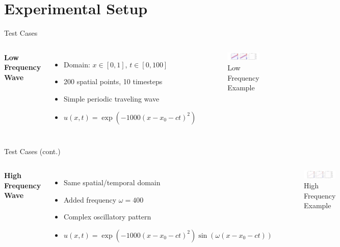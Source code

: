 \documentclass{beamer}
\begin{document}
\section{Experimental Setup}
\begin{frame}{Test Cases}
    \begin{columns}
        \textbf{Low Frequency Wave}
        \begin{itemize}
            \item Domain: $x \in [0,1]$, $t \in [0,100]$
            \item 200 spatial points, 10 timesteps
            \item Simple periodic traveling wave
            \item $u(x,t) = \exp(-1000(x-x_0-ct)^2)$
        \end{itemize}
        
        \begin{figure}
            \includegraphics[width=\textwidth]{functional/low-frequency-adam-20250206-1105-1/vis}
            \caption{Low Frequency Example}
        \end{figure}
    \end{columns}
\end{frame}

\begin{frame}{Test Cases (cont.)}
    \begin{columns}
        \textbf{High Frequency Wave}
        \begin{itemize}
            \item Same spatial/temporal domain
            \item Added frequency $\omega = 400$
            \item Complex oscillatory pattern
            \item $u(x,t) = \exp(-1000(x-x_0-ct)^2)\sin(\omega(x-x_0-ct))$
        \end{itemize}
        
        \begin{figure}
            \includegraphics[width=\textwidth]{functional/high-frequency-adam-20250206-1520-1/vis}
            \caption{High Frequency Example}
        \end{figure}
    \end{columns}
\end{frame}
\end{document}
